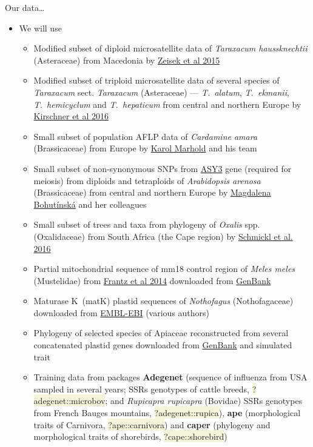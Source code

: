 \documentclass[compress, ucs, xelatex, 11pt, xcolor=svgnames, aspectratio=169,
	hyperref={
		bookmarks=true,
		unicode=true,
		colorlinks=true,
		pdftitle={Molecular data in R},
		plainpages=false,
		pdfauthor={Vojtech Zeisek},
		pdfsubject={Course about phylogeny and evolution in R},
		pdfcreator={XeLaTeX},
		pdfkeywords={R, evolution, phylogeny, molecular data},
		linkcolor=Crimson, %
		anchorcolor=Magenta, %
		citecolor=Magenta, %
		filecolor=Magenta, %
		menucolor=Magenta, %
		urlcolor=DodgerBlue, %
		pdftex},
	url={hyphens, lowtilde} %
	]{beamer}
\renewcommand{\texttt}[1]{\colorbox{Beige}{{\ttfamily #1}}}
\begin{document}
\begin{frame}[allowframebreaks]{Our data\ldots}
	\begin{itemize}
		\item We will use
		\begin{itemize}
			\item Modified subset of diploid microsatellite data of \textit{Taraxacum haussknechtii} (Asteraceae) from Macedonia by \href{https://trapa.cz/en/taraxacum-section-dioszegia}{Zeisek et al 2015}
			\item Modified subset of triploid microsatellite data of several species of \textit{Taraxacum} sect. \textit{Taraxacum} (Asteraceae) --- \textit{T.~alatum}, \textit{T.~ekmanii}, \textit{T.~hemicyclum} and \textit{T.~hepaticum} from central and northern Europe by \href{https://trapa.cz/en/identif-oligoclonal-agamospermous-microsp}{Kirschner et al 2016}
			\item Small subset of population AFLP data of \textit{Cardamine amara} (Brassicaceae) from Europe by \href{https://botany.natur.cuni.cz/brassiploidy/people}{Karol Marhold} and his team
			\item Small subset of non-synonymous SNPs from \href{https://www.arabidopsis.org/servlets/TairObject?type=locus&name=At2g46980}{ASY3} gene (required for meiosis) from diploids and tetraploids of \textit{Arabidopsis arenosa} (Brassicaceae) from central and northern Europe by \href{https://botany.natur.cuni.cz/ecolgen/people}{Magdalena Bohutínská} and her colleagues
			\item Small subset of trees and taxa from phylogeny of \textit{Oxalis} spp. (Oxalidaceae) from South Africa (the Cape region) by \href{https://onlinelibrary.wiley.com/doi/full/10.1111/1755-0998.12487}{Schmickl et al. 2016}
			\item Partial mitochondrial sequence of mm18 control region of \textit{Meles meles} (Mustelidae) from \href{https://www.nature.com/articles/hdy201445}{Frantz et al 2014} downloaded from \href{https://www.ncbi.nlm.nih.gov/popset/608602125}{GenBank}
			\item Maturase K~(matK) plastid sequences of \textit{Nothofagus} (Nothofagaceae) downloaded from \href{https://www.ebi.ac.uk/}{EMBL-EBI} (various authors)
			\item Phylogeny of selected species of Apiaceae reconstructed from several concatenated plastid genes downloaded from \href{https://www.ncbi.nlm.nih.gov/}{GenBank} and simulated trait
			\item Training data from packages \textbf{Adegenet} (sequence of influenza from USA sampled in several years; SSRs genotypes of cattle breeds, \texttt{?adegenet::microbov}; and \textit{Rupicapra rupicapra} (Bovidae) SSRs genotypes from French Bauges mountains, \texttt{?adegenet::rupica}), \textbf{ape} (morphological traits of Carnivora, \texttt{?ape::carnivora}) and \textbf{caper} (phylogeny and morphological traits of shorebirds, \texttt{?cape::shorebird})

\end{itemize}
\end{itemize}
\end{frame}
\end{document}
